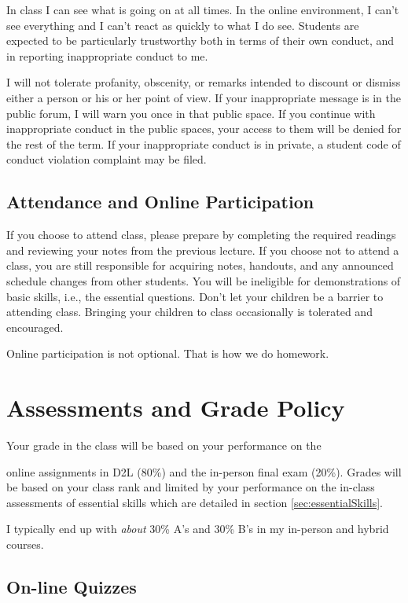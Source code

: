 \documentclass[letterpaper,10pt]{article}
\begin{document}
In class I can see what is going on at all times.  In the online
environment, I can't see everything and I can't react as quickly to
what I do see.  Students are expected to be particularly trustworthy
both in terms of their own conduct, and in reporting inappropriate
conduct to me.

I will not tolerate profanity, obscenity, or remarks intended to
discount or dismiss either a person or his or her point of view. If your inappropriate message is in the public forum, I will warn you
once in that public space. If you continue with inappropriate conduct
in the public spaces, your access to them will be denied for the rest
of the term. If your inappropriate
conduct is in private, a student code of conduct violation complaint
may be filed.

 \subsection{Attendance and Online Participation}
 
 If you choose to attend class, please prepare by completing the required readings and reviewing your notes from the previous lecture. If you choose not to attend a class, you are still responsible for acquiring notes, handouts, and any announced schedule changes from other students. You will be ineligible for demonstrations of basic skills, i.e., the essential questions. Don’t let your children be a barrier to attending class. Bringing your children to class occasionally is tolerated and encouraged.

Online participation is not optional. That is how we do homework.

\section{Assessments and Grade Policy}


Your grade in the class will be based on your performance on the

online assignments in D2L (80\%) and the in-person final exam (20\%).  Grades will be based on your class rank and limited by your performance on the in-class assessments of essential skills which are detailed in section \ref{sec:essentialSkills}. 

I typically end up with \emph{about} 30\%
A's and 30\% B's in my in-person and hybrid courses.    

\subsection{On-line Quizzes}
\end{document}
